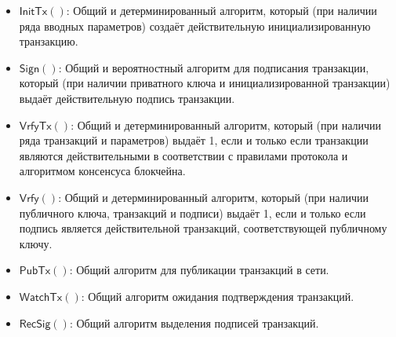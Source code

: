 \documentclass{llncs}
\newcommand{\Sign}{\textsf{Sign}}
\newcommand{\Verify}{\textsf{Vrfy}}
\newcommand{\InitTx}{\textsf{InitTx}}
\newcommand{\VrfyTx}{\textsf{VrfyTx}}
\newcommand{\PubTx}{\textsf{PubTx}}
\newcommand{\WatchTx}{\textsf{WatchTx}}
\newcommand{\RecSig}{\textsf{RecSig}}
\begin{document}
\begin{itemize}
    \item $\InitTx()$: Общий и детерминированный алгоритм, который (при наличии ряда вводных параметров) создаёт действительную инициализированную транзакцию.
    \item $\Sign()$: Общий и вероятностный алгоритм для подписания транзакции, который (при наличии приватного ключа и инициализированной транзакции) выдаёт действительную подпись транзакции.
    \item $\VrfyTx()$: Общий и детерминированный алгоритм, который (при наличии ряда транзакций и параметров) выдаёт 1, если и только если транзакции являются действительными в соответствии с правилами протокола и алгоритмом консенсуса блокчейна.
    \item $\Verify()$: Общий и детерминированный алгоритм, который (при наличии публичного ключа, транзакций и подписи) выдаёт 1, если и только если подпись является действительной транзакций, соответствующей публичному ключу.
    \item $\PubTx()$: Общий алгоритм для публикации транзакций в сети.
    \item $\WatchTx()$: Общий алгоритм ожидания подтверждения транзакций.
    \item $\RecSig()$: Общий алгоритм выделения подписей транзакций.
\end{itemize}

\newpage
\end{document}
